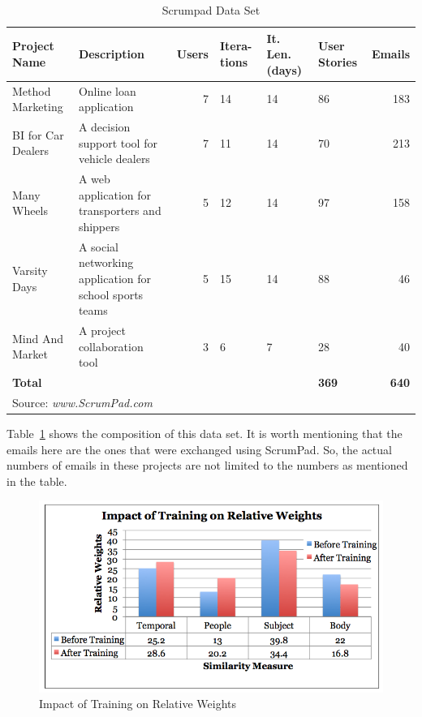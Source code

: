 \begin{table}
	\label{tab:scrumpad}
  \centering
  \caption{Scrumpad Data Set}
    \begin{tabular}{|p{2cm}|p{4cm}|r|p{1cm}|p{1.2cm}|p{1.2cm}|r|}
      \hline
      \textbf{Project Name} & \textbf{Description} & \textbf{Users} & \textbf{Itera- tions} & \textbf{It. Len. (days)}  & \textbf{User Stories} & \textbf{Emails}\\
      \hline
      Method Marketing & Online loan application & 7 & 14 & 14 & 86 & 183 \\
      \hline
      BI for Car Dealers & A decision support tool for vehicle dealers & 7 & 11 & 14 & 70 & 213 \\
      \hline
      Many Wheels & A web application for transporters and shippers & 5 & 12 & 14 & 97 & 158 \\
      \hline
      Varsity Days & A social networking application for school sports teams & 5 & 15 & 14 & 88 & 46 \\
      \hline
      Mind And Market & A project collaboration tool & 3 & 6 & 7 & 28 & 40 \\
      \hline
      \textbf{Total} &  &  &  &  & \textbf{369} & \textbf{640}\\
      \hline
      \multicolumn{7}{l}{Source: \emph{www.ScrumPad.com}}
    \end{tabular}
\end{table}

Table~\ref{tab:scrumpad} shows the composition of this data set. It is worth mentioning that the emails here are the ones that were exchanged using ScrumPad. So, the actual numbers of emails in these projects are not limited to the numbers as mentioned in the table.

\begin{figure}[htb]
	\centering
	\includegraphics[width=\textwidth]{training.png}
    \caption{Impact of Training on Relative Weights}
	\label{fig:training}
\end{figure}

